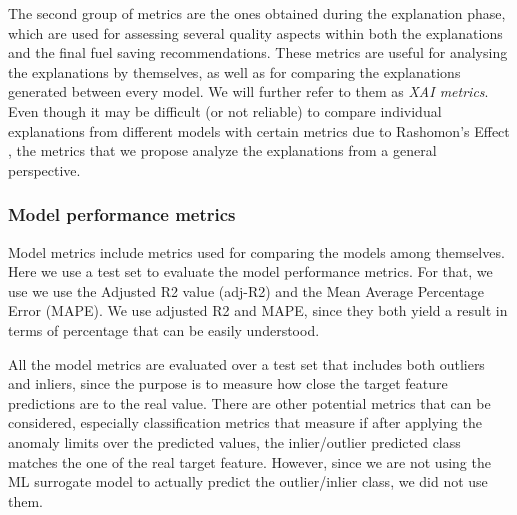 The second group of metrics are the ones obtained during the explanation phase, which are used for assessing several quality aspects within both the explanations and the final fuel saving recommendations. These metrics are useful for analysing the explanations by themselves, as well as for comparing the explanations generated between every model. We will further refer to them as \textit{XAI metrics}. Even though it may be difficult (or not reliable) to compare individual explanations from different models with certain metrics due to Rashomon's Effect \parencite{molnar2019interpretable}, the metrics that we propose analyze the explanations from a general perspective.

\subsubsection{Model performance metrics}\label{subsec:ch6-model-metrics}
\leavevmode\newline
Model metrics include metrics used for comparing the models among themselves. Here we use a test set to evaluate the model performance metrics. For that, we use we use the Adjusted R2 value (adj-R2) and the Mean Average Percentage Error (MAPE). We use adjusted R2 and MAPE, since they both yield a result in terms of percentage that can be easily understood.

All the model metrics are evaluated over a test set that includes both outliers and inliers, since the purpose is to measure how close the target feature predictions are to the real value. There are other potential metrics that can be considered, especially classification metrics that measure if after applying the anomaly limits over the predicted values, the inlier/outlier predicted class matches the one of the real target feature. However, since we are not using the ML surrogate model to actually predict the outlier/inlier class, we did not use them. 

